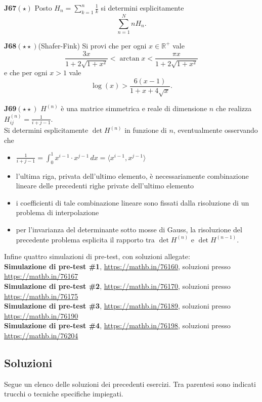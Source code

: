 \documentclass[a4paper,twoside]{article}
\theoremstyle{definition}
\numberwithin{theorem}{section}
\begin{document}
\textbf{J67}$(\star)$ Posto $H_n=\sum_{k=1}^{n}\frac{1}{k}$ si determini esplicitamente
$$ \sum_{n=1}^{N} n H_n. $$

\textbf{J68}$(\star\star)$(Shafer-Fink) Si provi che per ogni $x\in\mathbb{R}^+$ vale 
$$ \frac{3x}{1+2\sqrt{1+x^2}} < \arctan x < \frac{\pi x}{1+2\sqrt{1+x^2}} $$ 
e che per ogni $x> 1$ vale
$$ \log(x) > \frac{6(x-1)}{1+x+4\sqrt{x}}. $$

\textbf{J69}$(\star\star)$ $H^{(n)}$ è una matrice simmetrica e reale di dimensione $n$ che realizza $H_{ij}^{(n)}=\frac{1}{i+j-1}$.\\ Si determini esplicitamente $\det H^{(n)}$ in funzione di $n$, eventualmente osservando che
\begin{itemize}
\item $\frac{1}{i+j-1}=\int_{0}^{1}x^{i-1}\cdot x^{j-1}\,dx = \langle x^{i-1}, x^{j-1}\rangle $
\item l'ultima riga, privata dell'ultimo elemento, è necessariamente combinazione lineare delle precedenti righe private dell'ultimo elemento
\item i coefficienti di tale combinazione lineare sono fissati dalla risoluzione di un problema di interpolazione 
\item per l'invarianza del determinante sotto mosse di Gauss, la risoluzione del precedente problema esplicita il rapporto tra $\det H^{(n)}$ e $\det H^{(n-1)}$.
\end{itemize}

Infine quattro simulazioni di pre-test, con soluzioni allegate:\\

\textbf{Simulazione di pre-test \#1}, \url{https://mathb.in/76160}, soluzioni presso \url{https://mathb.in/76167}\\
\textbf{Simulazione di pre-test \#2}, \url{https://mathb.in/76170}, soluzioni presso \url{https://mathb.in/76175}\\
\textbf{Simulazione di pre-test \#3}, \url{https://mathb.in/76189}, soluzioni presso \url{https://mathb.in/76190}\\
\textbf{Simulazione di pre-test \#4}, \url{https://mathb.in/76198}, soluzioni presso \url{https://mathb.in/76204}\\

\newpage

\subsection{Soluzioni}
Segue un elenco delle soluzioni dei precedenti esercizi. Tra parentesi sono indicati trucchi o tecniche specifiche impiegati.\\
\end{document}
